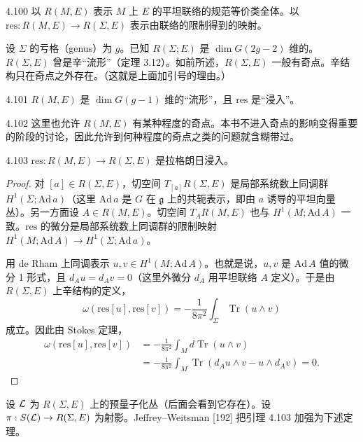 \begin{definition}{4.100}
  以 $R(M,E)$ 表示 $M$ 上 $E$ 的平坦联络的规范等价类全体。以 $\mathrm{res}:R(M,E)\to R(\Sigma,E)$ 表示由联络的限制得到的映射。
\end{definition}

设 $\Sigma$ 的亏格（genus）为 $g$。已知 $R(\Sigma;E)$ 是 $\dim G(2g-2)$ 维的。$R(\Sigma,E)$ 曾是辛“流形”（定理 3.12）。如前所述，$R(\Sigma,E)$ 一般有奇点。辛结构只在奇点之外存在。（这就是上面加引号的理由。）

\begin{assumption}{4.101}
  $R(M,E)$ 是 $\dim G(g-1)$ 维的“流形”，且 $\mathrm{res}$ 是“浸入”。
\end{assumption}

\begin{remark}{4.102}
  这里也允许 $R(M,E)$ 有某种程度的奇点。本书不进入奇点的影响变得重要的阶段的讨论，因此允许到何种程度的奇点之类的问题就含糊带过。
\end{remark}

\begin{lemma*}{4.103}
  $\mathrm{res}:R(M,E)\to R(\Sigma,E)$ 是拉格朗日浸入。
\end{lemma*}

\begin{proof}
  对 $[a]\in R(\Sigma,E)$，切空间 $T_{[a]}R(\Sigma,E)$ 是局部系统数上同调群 $H^1(\Sigma;\mathrm{Ad}\,a)$（这里 $\mathrm{Ad}\,a$ 是 $G$ 在 $\mathfrak{g}$ 上的共轭表示，即由 $a$ 诱导的平坦向量丛）。另一方面设 $A\in R(M,E)$。切空间 $T_AR(M,E)$ 也与 $H^1(M;\mathrm{Ad}\,A)$ 一致。$\mathrm{res}$ 的微分是局部系统数上同调群的限制映射 $H^1(M;\mathrm{Ad}\,A)\to H^1(\Sigma;\mathrm{Ad}\,a)$。

  用 de Rham 上同调表示 $u,v\in H^1(M;\mathrm{Ad}\,A)$。也就是说，$u,v$ 是 $\mathrm{Ad}\,A$ 值的微分 1 形式，且 $d_Au=d_Av=0$（这里外微分 $d_A$ 用平坦联络 $A$ 定义）。于是由 $R(\Sigma,E)$ 上辛结构的定义，
  \[
    \omega(\mathrm{res}[u],\mathrm{res}[v])=-\frac{1}{8\pi^2}\int_\Sigma\operatorname{Tr}(u\wedge v)
  \]
  成立。因此由 Stokes 定理，
  \begin{align*}
    \omega(\mathrm{res}[u],\mathrm{res}[v])
    &=-\frac{1}{8\pi^2}\int_M d\operatorname{Tr}(u\wedge v) \\
    &=-\frac{1}{8\pi^2}\int_M\operatorname{Tr}(d_Au\wedge v-u\wedge d_Av)=0.
  \end{align*}
\end{proof}

设 $\mathcal{L}$ 为 $R(\Sigma,E)$ 上的预量子化丛（后面会看到它存在）。设 $\pi:S(\mathcal{L})\to R(\Sigma,E)$ 为射影。Jeffrey–Weitsman [192] 把引理 4.103 加强为下述定理。

